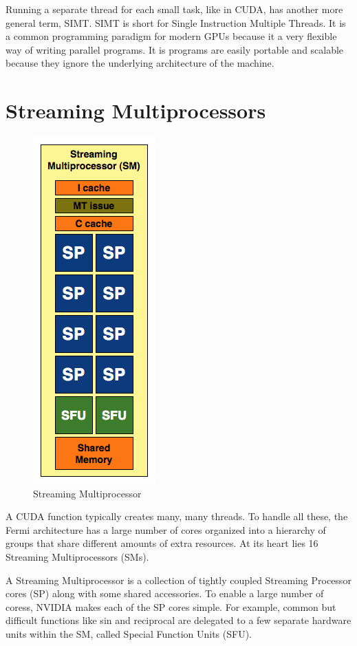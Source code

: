 \documentclass[../main/report.tex]{subfiles}
\begin{document}
Running a separate thread for each small task, like in CUDA, has another more general term, SIMT.
SIMT is short for Single Instruction Multiple Threads.
It is a common programming paradigm for modern GPUs because it a very flexible way of writing parallel programs.
It is programs are easily portable and scalable because they ignore the underlying architecture of the machine.

\section{Streaming Multiprocessors}

\begin{figure}
\centering
\includegraphics[scale=0.40]{../introduction/assets/SM.png}
\caption{Streaming Multiprocessor}
\label{fig:sm}
\end{figure}

A CUDA function typically creates many, many threads.
To handle all these, the Fermi architecture has a large number of cores organized into a hierarchy of groups that share different amounts of extra resources.
At its heart lies 16 Streaming Multiprocessors (SMs).

A Streaming Multiprocessor is a collection of tightly coupled Streaming Processor cores (SP) along with some shared accessories.
To enable a large number of coress, NVIDIA makes each of the SP cores simple.
For example, common but difficult functions like sin and reciprocal are delegated to a few separate hardware units within the SM, called Special Function Units (SFU).
\end{document}
